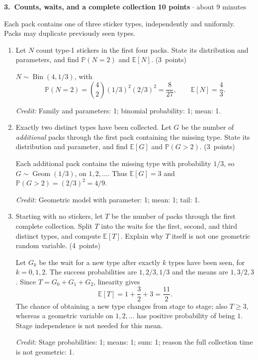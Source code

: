 \documentclass[11pt,letterpaper]{article}
\newcommand{\Prob}{\mathbb P}
\newcommand{\E}{\mathbb E}
\newcommand{\partpts}[1]{\unskip\nobreak\hspace{.3em}%
  \mbox{\small\color{muted}(#1 points)}}
\newcommand{\credit}[1]{\par{\footnotesize\color{muted}\textit{Credit:} #1}}
\newcommand{\problem}[4]{\par\addvspace{8pt}%
  {\large\bfseries\color{indigo}#1.\ #2}\hfill
  {\small\color{muted}\textbf{#3 points} $\cdot$ about #4 minutes}\par\nobreak}
\begin{document}
\newpage
\problem{3}{Counts, waits, and a complete collection}{10}{9}
Each pack contains one of three sticker types, independently and uniformly.
Packs may duplicate previously seen types.
\begin{enumerate}
\item Let $N$ count type-1 stickers in the first four packs. State its
distribution and parameters, and find $\Prob(N=2)$ and $\E[N]$.
\partpts{3}
\begin{solution}[1.25in]
$N\sim\operatorname{Bin}(4,1/3)$, with
\[
\Prob(N=2)=\binom42(1/3)^2(2/3)^2=\frac8{27},
\qquad \E[N]=\frac43.
\]
\credit{Family and parameters: 1; binomial probability: 1; mean: 1.}
\end{solution}
\item Exactly two distinct types have been collected. Let $G$ be the
number of \emph{additional} packs through the first pack containing the
missing type. State its distribution and parameter, and find $\E[G]$
and $\Prob(G>2)$. \partpts{3}
\begin{solution}[1.35in]
Each additional pack contains the missing type with probability $1/3$,
so $G\sim\operatorname{Geom}(1/3)$, on $1,2,\ldots$.
Thus $\E[G]=3$ and $\Prob(G>2)=(2/3)^2=4/9$.
\credit{Geometric model with parameter: 1; mean: 1; tail: 1.}
\end{solution}
\item Starting with no stickers, let $T$ be the number of packs through
the first complete collection. Split $T$ into the waits for the first,
second, and third distinct types, and compute $\E[T]$. Explain why
$T$ itself is not one geometric random variable. \partpts{4}
\begin{solution}[1.8in]
Let $G_k$ be the wait for a new type after exactly $k$ types have been seen,
for $k=0,1,2$. The success probabilities are $1,2/3,1/3$ and the
means are $1,3/2,3$. Since $T=G_0+G_1+G_2$, linearity gives
\[
\E[T]=1+\frac32+3=\frac{11}{2}.
\]
The chance of obtaining a new type changes from stage to stage; also
$T\ge3$, whereas a geometric variable on $1,2,\ldots$ has positive
probability of being $1$. Stage independence is not needed for this mean.
\credit{Stage probabilities: 1; means: 1; sum: 1;
reason the full collection time is not geometric: 1.}
\end{solution}
\end{enumerate}
\end{document}
